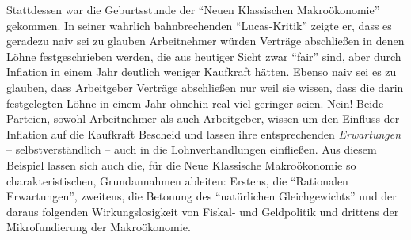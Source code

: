 Stattdessen war die Geburtsstunde der "`Neuen Klassischen Makroökonomie"' gekommen. In seiner wahrlich bahnbrechenden "`Lucas-Kritik"' \parencite[S. 19ff]{Lucas1976} zeigte er, dass es geradezu naiv sei zu glauben Arbeitnehmer würden Verträge abschließen in denen Löhne festgeschrieben werden, die aus heutiger Sicht zwar "`fair"' sind, aber durch Inflation in einem Jahr deutlich weniger Kaufkraft hätten. Ebenso naiv sei es zu glauben, dass Arbeitgeber Verträge abschließen nur weil sie wissen, dass die darin festgelegten Löhne in einem Jahr ohnehin real viel geringer seien. Nein! Beide Parteien, sowohl Arbeitnehmer als auch Arbeitgeber, wissen um den Einfluss der Inflation auf die Kaufkraft Bescheid und lassen ihre entsprechenden \textit{Erwartungen} -- selbstverständlich -- auch in die Lohnverhandlungen einfließen. Aus diesem Beispiel lassen sich auch die, für die Neue Klassische Makroökonomie so charakteristischen, Grundannahmen ableiten: Erstens, die "`Rationalen Erwartungen"', zweitens, die Betonung des "`natürlichen Gleichgewichts"' und der daraus folgenden Wirkungslosigkeit von Fiskal- und Geldpolitik und drittens der Mikrofundierung der Makroökonomie.

